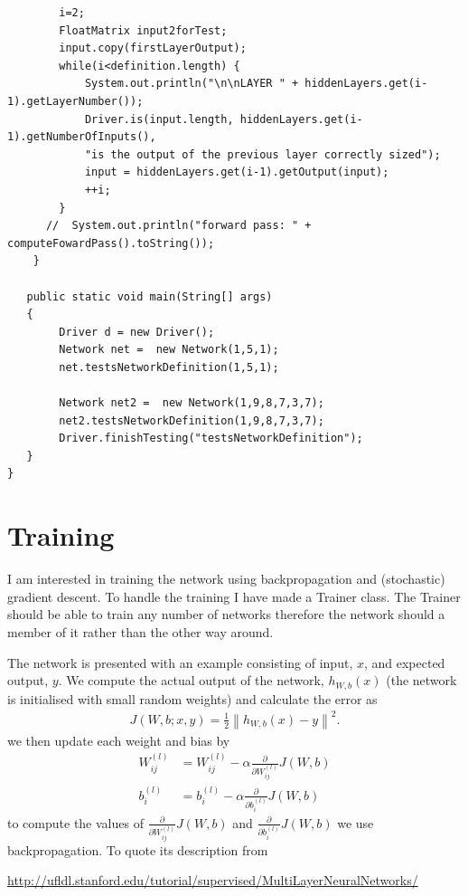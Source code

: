 \documentclass[11pt]{article} %
\begin{document}
\begin{lstlisting}
        i=2;
        FloatMatrix input2forTest;
        input.copy(firstLayerOutput);
        while(i<definition.length) {
            System.out.println("\n\nLAYER " + hiddenLayers.get(i-1).getLayerNumber());
            Driver.is(input.length, hiddenLayers.get(i-1).getNumberOfInputs(),
            "is the output of the previous layer correctly sized");
            input = hiddenLayers.get(i-1).getOutput(input);
            ++i;
        }
      //  System.out.println("forward pass: " + computeFowardPass().toString());
    }

   public static void main(String[] args)
   {
        Driver d = new Driver();
        Network net =  new Network(1,5,1);
        net.testsNetworkDefinition(1,5,1);
       
        Network net2 =  new Network(1,9,8,7,3,7);
        net2.testsNetworkDefinition(1,9,8,7,3,7);
        Driver.finishTesting("testsNetworkDefinition");
   }
}
\end{lstlisting}


\section{Training}
I am interested in training the network using backpropagation and (stochastic) gradient descent. To handle the training I have made a Trainer class. The Trainer should be able to train any number of networks therefore the network should a member of it rather than the other way around.

The network is presented with an example consisting of input, $x$, and expected output, $y$. We compute the actual output of the network, $h_{W,b}(x)$ (the network is initialised with small random weights) and calculate the error as
\begin{align}
J(W,b; x,y) = \frac{1}{2} \left\| h_{W,b}(x) - y \right\|^2.
\end{align}
we then update each weight and bias by
\begin{align}
W_{ij}^{(l)} &= W_{ij}^{(l)} - \alpha \frac{\partial}{\partial W_{ij}^{(l)}} J(W,b) \\
b_{i}^{(l)} &= b_{i}^{(l)} - \alpha \frac{\partial}{\partial b_{i}^{(l)}} J(W,b)
\end{align}
to compute the values of $\frac{\partial}{\partial W_{ij}^{(l)}} J(W,b)$ and $\frac{\partial}{\partial b_{i}^{(l)}} J(W,b)$ we use backpropagation. To quote its description from 

\url{http://ufldl.stanford.edu/tutorial/supervised/MultiLayerNeuralNetworks/}
\end{document}
